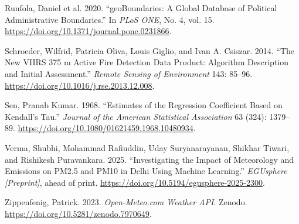 \documentclass[
  11pt,
]{article}
\newlength{\cslhangindent}
\newenvironment{CSLReferences}[2] %
 {\begin{list}{}{%
  \setlength{\itemindent}{0pt}
  \setlength{\leftmargin}{0pt}
  \setlength{\parsep}{0pt}
  \ifodd #1
   \setlength{\leftmargin}{\cslhangindent}
   \setlength{\itemindent}{-1\cslhangindent}
  \fi
  \setlength{\itemsep}{#2\baselineskip}}}
 {\end{list}}
\begin{document}
\begin{CSLReferences}{1}{1}
{Runfola, Daniel et al.} 2020. {``{geoBoundaries}: A Global Database of
Political Administrative Boundaries.''} In \emph{PLoS ONE}, No. 4, vol.
15. \url{https://doi.org/10.1371/journal.pone.0231866}.

Schroeder, Wilfrid, Patricia Oliva, Louis Giglio, and Ivan A. Csiszar.
2014. {``The New {VIIRS} 375 m Active Fire Detection Data Product:
Algorithm Description and Initial Assessment.''} \emph{Remote Sensing of
Environment} 143: 85--96.
\url{https://doi.org/10.1016/j.rse.2013.12.008}.

Sen, Pranab Kumar. 1968. {``Estimates of the Regression Coefficient
Based on {Kendall}'s Tau.''} \emph{Journal of the American Statistical
Association} 63 (324): 1379--89.
\url{https://doi.org/10.1080/01621459.1968.10480934}.

Verma, Shubhi, Mohammad Rafiuddin, Uday Suryanarayanan, Shikhar Tiwari,
and Rishikesh Puravankara. 2025. {``Investigating the Impact of
Meteorology and Emissions on {PM2.5} and {PM10} in {Delhi} Using Machine
Learning.''} \emph{EGUsphere {[}Preprint{]}}, ahead of print.
\url{https://doi.org/10.5194/egusphere-2025-2300}.

Zippenfenig, Patrick. 2023. \emph{{Open-Meteo.com} Weather {API}}.
Zenodo. \url{https://doi.org/10.5281/zenodo.7970649}.

\end{CSLReferences}
\end{document}
